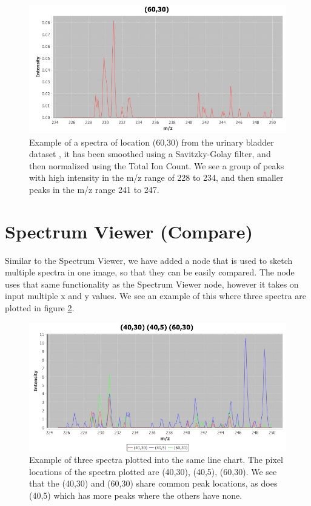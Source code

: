 \documentclass[11pt,openany]{book}
\begin{document}
\begin{figure}
    \centering
    \includegraphics[width=\textwidth]{./images/MS_Imaging/(60,30)_urinarybladder_smooth_normalize.jpeg}
    \caption{Example of a spectra of location (60,30) from the urinary bladder dataset \cite{imzml.org}, it has been smoothed using a Savitzky-Golay filter, and then normalized using the Total Ion Count. We see a group of peaks with high intensity in the m/z range of 228 to 234, and then smaller peaks in the m/z range 241 to 247.}
    \label{fig:example_spectra_viewer}
\end{figure}

\section{Spectrum Viewer (Compare)}
Similar to the Spectrum Viewer, we have added a node that is used to sketch multiple spectra in one image, so that they can be easily compared. The node uses that same functionality as the Spectrum Viewer node, however it takes on input multiple x and y values. We see an example of this where three spectra are plotted in figure \ref{fig:MS_Imaging:multiple_spectra_example}.

\begin{figure}
    \centering
    \includegraphics[width=\textwidth]{./images/MS_Imaging/(40,30)-(40,5)(60,30)-urinarybladder_smooth.jpeg}
    \caption{Example of three spectra plotted into the same line chart. The pixel locations of the spectra plotted are (40,30), (40,5), (60,30). We see that the (40,30) and (60,30) share common peak locations, as does (40,5) which has more peaks where the others have none.}
    \label{fig:MS_Imaging:multiple_spectra_example}
\end{figure}
\end{document}
